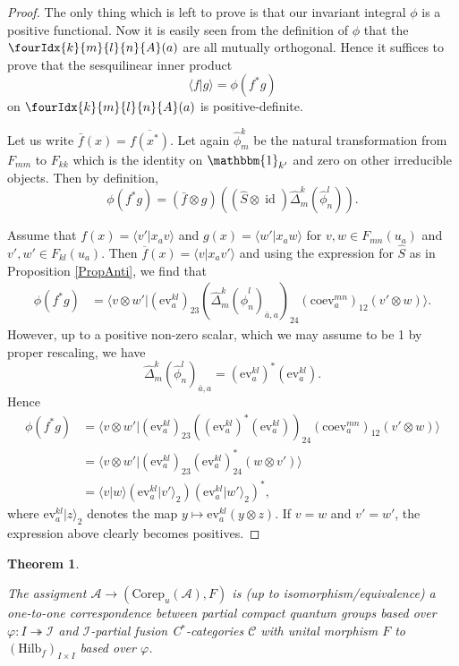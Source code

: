 \documentclass[10pt]{article}
\DeclareMathOperator{\id}{id}
\newcommand{\Corep}{\mathrm{Corep}}
\newcommand{\CatCC}{\mathscr{C}}
\newcommand{\Hilb}{\mathrm{Hilb}}
\newcommand{\ev}{\mathrm{ev}}
\newcommand{\coev}{\mathrm{coev}}
\newcommand{\Unitb}{\mathbbm{1}}
\newcommand{\Gr}[5]{\fourIdx{#2}{#4}{#3}{#5}{#1}}%
\newtheorem{Theorem}{Theorem}[section]
\theoremstyle{definition}
\numberwithin{equation}{section}
\begin{document}
\begin{proof} The only thing which is left to prove is that our
  invariant integral $\phi$ is a positive functional. Now it is easily
  seen from the definition of $\phi$ that the $\Gr{A}{k}{l}{m}{n}(a)$
  are all mutually orthogonal. Hence it suffices to prove that the
  sesquilinear inner product \[\langle f| g\rangle = \phi(f^*g)\] on
  $\Gr{A}{k}{l}{m}{n}(a)$ is positive-definite.

  Let us write $\bar{f}(x) = \overline{f(x^*)}$. Let again
  $\hat{\phi}^k_m$ be the natural transformation from $F_{mm}$ to
  $F_{kk}$ which is the identity on $\Unitb_{k'}$ and zero on other
  irreducible objects. Then by definition, \[\phi(f^*g) =
  (\bar{f}\otimes g)((\hat{S}\otimes
  \id)\hat{\Delta}^k_m(\hat{\phi}^l_n)).\] 

Assume  that $f(x) = \langle v'| x_a v\rangle$ and
  $g(x) = \langle w' | x_aw\rangle$ for $v,w\in F_{mn}(u_a)$ and
  $v',w'\in F_{kl}(u_a)$. Then
  $\overline{f}(x) = \langle v|x_{a} v'\rangle$ and
 using the expression for $\hat{S}$ as
  in Proposition \ref{PropAnti}, we find that
  \begin{align*}
    \phi(f^*g) &= \langle v \otimes w'|
    (\ev_{a}^{kl})_{23} 
    (\hat\Delta^{k}_{m}(\hat \phi^{l}_{n})_{\bar a, a})_{24} 
    (\coev^{mn}_{a})_{12} (v'\otimes
    w)\rangle.
  \end{align*}
  However, up to a positive non-zero scalar, which we may assume to be
  1 by proper rescaling, we
  have 
  \[\hat{\Delta}^k_m(\hat{\phi}^l_n)_{\bar{a}, a} =
  (\ev^{kl}_{a})^{*}(\ev^{kl}_{a}).\] Hence
  \begin{align*}
    \phi(f^*g) &=
\langle v \otimes w'|     (\ev^{kl}_{a})_{23}  (
  (\ev^{kl}_{a})^{*}(\ev^{kl}_{a}))_{24}
 (\coev^{mn}_{a})_{12} (v'\otimes w)\rangle \\
&= \langle v \otimes w'|        (\ev^{kl}_{a})_{23} 
  (\ev^{kl}_{a})^{*}_{24}
 (w\otimes v')\rangle \\
    &= \langle v|w\rangle (\ev^{kl}_{a}|v'\rangle_{2})
    (\ev_{a}^{kl}|w'\rangle_{2})^{*},
  \end{align*}
where $\ev_{a}^{kl}|z\rangle_{2}$ denotes the map $y \mapsto
\ev_{a}^{kl}(y\otimes z)$.
If $v=w$ and $v'=w'$, the expression above clearly becomes positives.
\end{proof} 

\begin{Theorem} \label{TheoTKPCQG}

The assigment $\mathscr{A}\rightarrow (\Corep_u(\mathscr{A}),F)$ is (up to isomorphism/equivalence) a one-to-one correspondence between partial compact quantum groups based over $\varphi:I\twoheadrightarrow \mathscr{I}$ and $\mathscr{I}$-partial fusion C$^*$-categories $\CatCC$ with unital morphism $F$ to $(\Hilb_f)_{I\times I}$ based over $\varphi$. 
\end{Theorem} 
\end{document}
